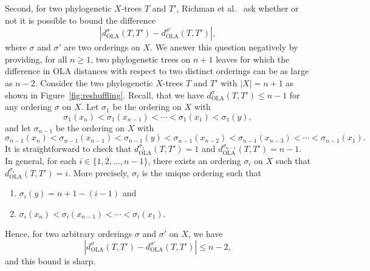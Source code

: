 \documentclass{article}
\newcommand{\OLA}{\mathrm{OLA}}
\begin{document}
Second, for two phylogenetic $X$-trees $T$ and $T'$, Richman et al.~\cite[page 10]{ola} ask whether or not it is possible to bound the difference
$$\left|d_\OLA^\sigma(T,T')-d_\OLA^{\sigma'}(T,T')\right|,$$
where $\sigma$ and $\sigma'$ are two orderings  on $X$. We answer this question negatively by providing, for all $n\ge 1$, two phylogenetic trees on $n+1$ leaves for which the difference in OLA distances with respect to two distinct orderings can be as large as $n-2$. Consider the two phylogenetic $X$-trees $T$ and $T'$ with $|X|=n+1$ as shown in Figure~\ref{fig:reshuffling}. 
Recall, that we have $d_\OLA^\sigma(T,T')\leq n-1$ for any ordering $\sigma$ on $X$. Let $\sigma_1$ be the ordering on $X$ with 
$$\sigma_1(x_n)<\sigma_1(x_{n-1})<\cdots<\sigma_1(x_1)<\sigma_1(y),$$
and let $\sigma_{n-1}$ be the ordering on $X$ with $$\sigma_{n-1}(x_n)<\sigma_{n-1}(x_{n-1})<\sigma_{n-1}(y)<\sigma_{n-1}(x_{n-2})<\sigma_{n-1}(x_{n-3})<\cdots<\sigma_{n-1}(x_1).$$ It is straightforward to check that $d_\OLA^{\sigma_1}(T,T')=1$ and $d_\OLA^{\sigma_{n-1}}(T,T')=n-1$.
In general, for each $i\in\{1,2,\ldots,n-1\}$, there exists an ordering $\sigma_i$ on $X$ such that $d_\OLA^{\sigma_i}(T,T')=i$. More precisely, $\sigma_i$ is the unique ordering such that
\begin{enumerate}
\itemsep 0pt
\item $\sigma_i(y)=n+1-(i-1)$ and
\item $\sigma_i(x_n)<\sigma_i(x_{n-1})<\cdots<\sigma_i(x_1)$.
\end{enumerate}
Hence, for two arbitrary orderings $\sigma$ and $\sigma'$ on $X$, we have
$$\left|d^\sigma_\OLA(T, T') - d^{\sigma'}_\OLA(T, T')\right|\le n-2,$$
and this bound is sharp.
\end{document}
